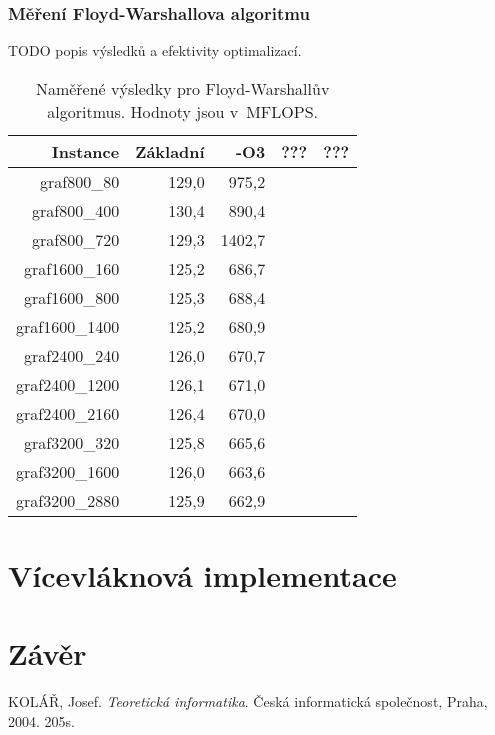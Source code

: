 \documentclass[a4paper,11pt]{article}
\begin{document}
\subsubsection{Měření Floyd-Warshallova algoritmu}
TODO popis výsledků a efektivity optimalizací.
\begin{table}[H]
  \begin{center}
      \begin{tabular}{|r|r|r|r|r|}
      \hline
      Instance  	& Základní  & -O3     & ???	 & ???  \\ \hline
      graf800\_80  	& 129,0     & 975,2   &  &          \\ \hline
      graf800\_400     	& 130,4     & 890,4   &  &	    \\ \hline
      graf800\_720  	& 129,3     & 1402,7  &  &	    \\ \hline
      graf1600\_160    	& 125,2     & 686,7   &  &	    \\ \hline
      graf1600\_800  	& 125,3     & 688,4   &  &	    \\ \hline
      graf1600\_1400   	& 125,2     & 680,9   &  &	    \\ \hline
      graf2400\_240  	& 126,0     & 670,7   &  &          \\ \hline
      graf2400\_1200   	& 126,1     & 671,0   &  &          \\ \hline
      graf2400\_2160  	& 126,4     & 670,0   &  &          \\ \hline
      graf3200\_320    	& 125,8     & 665,6   &  &          \\ \hline
      graf3200\_1600  	& 126,0     & 663,6   &  &          \\ \hline
      graf3200\_2880   	& 125,9     & 662,9   &  &          \\ \hline
      \end{tabular}
  \caption{Naměřené výsledky pro Floyd-Warshallův algoritmus. Hodnoty jsou v~MFLOPS.}
  \label{tab:fw1}
  \end{center}
\end{table}



\section{Vícevláknová implementace}

\section{Závěr}


\newpage
\begin{thebibliography}{1}
   KOLÁŘ, Josef.
    \emph{Teoretická informatika}.
    Česká informatická společnost, Praha, 2004. 205s.
\end{thebibliography}
\end{document}
